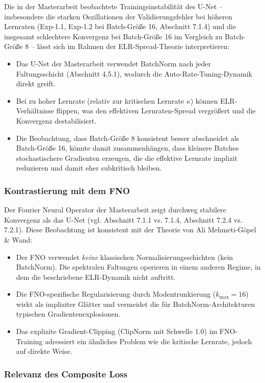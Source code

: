 \documentclass[a4paper,12pt]{article}
\begin{document}
Die in der Masterarbeit beobachtete Trainingsinstabilität des U-Net -- insbesondere die starken Oszillationen der Validierungsfehler bei höheren Lernraten (Exp-1.1, Exp-1.2 bei Batch-Größe 16, Abschnitt 7.1.4) und die insgesamt schlechtere Konvergenz bei Batch-Größe 16 im Vergleich zu Batch-Größe 8 -- lässt sich im Rahmen der ELR-Spread-Theorie interpretieren:
\begin{itemize}
    \item Das U-Net der Masterarbeit verwendet BatchNorm nach jeder Faltungsschicht (Abschnitt 4.5.1), wodurch die Auto-Rate-Tuning-Dynamik direkt greift.
    \item Bei zu hoher Lernrate (relativ zur kritischen Lernrate $\kappa$) können ELR-Verhältnisse flippen, was den effektiven Lernraten-Spread vergrößert und die Konvergenz destabilisiert.
    \item Die Beobachtung, dass Batch-Größe 8 konsistent besser abschneidet als Batch-Größe 16, könnte damit zusammenhängen, dass kleinere Batches stochastischere Gradienten erzeugen, die die effektive Lernrate implizit reduzieren und damit eher subkritisch bleiben.
\end{itemize}

\subsubsection*{Kontrastierung mit dem FNO}

Der Fourier Neural Operator der Masterarbeit zeigt durchweg stabilere Konvergenz als das U-Net (vgl. Abschnitt 7.1.1 vs. 7.1.4, Abschnitt 7.2.4 vs. 7.2.1). Diese Beobachtung ist konsistent mit der Theorie von Ali Mehmeti-Göpel \& Wand:
\begin{itemize}
    \item Der FNO verwendet \emph{keine} klassischen Normalisierungsschichten (kein BatchNorm). Die spektralen Faltungen operieren in einem anderen Regime, in dem die beschriebene ELR-Dynamik nicht auftritt.
    \item Die FNO-spezifische Regularisierung durch Modentrunkierung ($k_{\max} = 16$) wirkt als impliziter Glätter und vermeidet die für BatchNorm-Architekturen typischen Gradientenexplosionen.
    \item Das explizite Gradient-Clipping (ClipNorm mit Schwelle 1.0) im FNO-Training adressiert ein ähnliches Problem wie die kritische Lernrate, jedoch auf direkte Weise.
\end{itemize}

\subsubsection*{Relevanz des Composite Loss}
\end{document}

